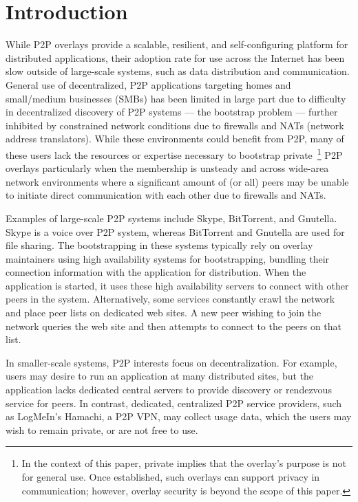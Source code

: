 \documentclass[conference]{IEEEtran}
\begin{document}
\section{Introduction}

While P2P overlays provide a scalable, resilient, and self-configuring platform
for distributed applications, their adoption rate for use across the Internet
has been slow outside of large-scale systems, such as data distribution and
communication.  General use of decentralized, P2P applications targeting homes
and small/medium businesses (SMBs) has been limited in large part due to
difficulty in decentralized discovery of P2P systems --- the bootstrap problem
--- further inhibited by constrained network conditions due to firewalls and
NATs (network address translators).  While these environments could benefit
from P2P, many of these users lack the resources or expertise necessary to
bootstrap private~\footnote{In the context of this paper, private implies that
the overlay's purpose is not for general use. Once established, such overlays
can support privacy in communication; however, overlay security is beyond the
scope of this paper.} P2P overlays particularly when the membership is unsteady
and across wide-area network environments where a significant amount of (or
all) peers may be unable to initiate direct communication with each other due
to firewalls and NATs.

Examples of large-scale P2P systems include Skype, BitTorrent, and Gnutella.
Skype is a voice over P2P system, whereas BitTorrent and Gnutella are used for
file sharing.  The bootstrapping in these systems typically rely on overlay
maintainers using high availability systems for bootstrapping, bundling their
connection information with the application for distribution.  When the
application is started, it uses these high availability servers to connect with
other peers in the system.  Alternatively, some services constantly crawl the
network and place peer lists on dedicated web sites. A new peer wishing to join
the network queries the web site and then attempts to connect to the peers on
that list.

In smaller-scale systems, P2P interests focus on decentralization.  For
example, users may desire to run an application at many distributed sites, but
the application lacks dedicated central servers to provide discovery or
rendezvous service for peers.  In contrast, dedicated, centralized P2P service
providers, such as LogMeIn's Hamachi, a P2P VPN, may collect usage data, which
the users may wish to remain private, or are not free to use.
\end{document}
